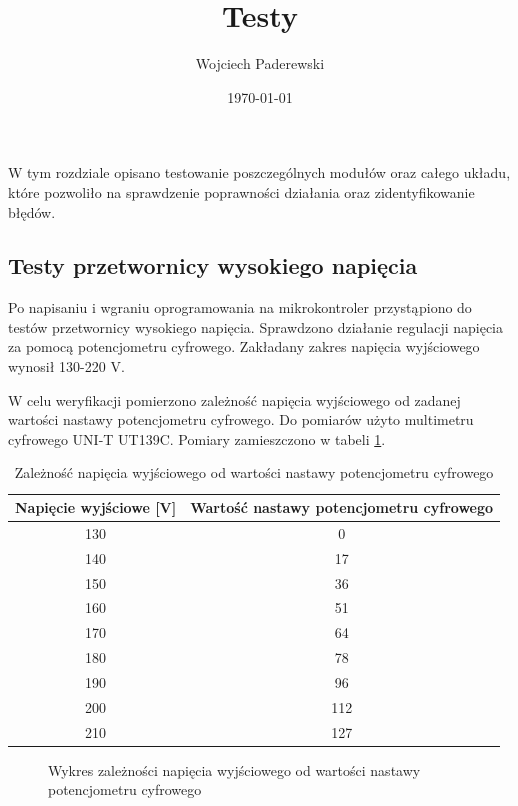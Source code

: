 \documentclass[../main.tex]{subfiles}
\author{Wojciech Paderewski}
\date{\today}
\title{Testy}
\begin{document}
W tym rozdziale opisano testowanie poszczególnych 
modułów oraz całego układu, które pozwoliło na sprawdzenie poprawności działania oraz zidentyfikowanie błędów.

\subsection{Testy przetwornicy wysokiego napięcia}
Po napisaniu i wgraniu oprogramowania na mikrokontroler przystąpiono do testów przetwornicy wysokiego napięcia.
Sprawdzono działanie regulacji napięcia za pomocą potencjometru cyfrowego. Zakładany zakres napięcia wyjściowego wynosił 130-220 V.

W celu weryfikacji pomierzono zależność napięcia wyjściowego od zadanej wartości nastawy potencjometru cyfrowego.
Do pomiarów użyto multimetru cyfrowego UNI-T UT139C. Pomiary zamieszczono w tabeli \ref{tab:voltage}.

\begin{table}[H]
    \centering
    \begin{tabular}{|c|c|}
        \hline
        Napięcie wyjściowe [V] & Wartość nastawy potencjometru cyfrowego \\
        \hline
        130 & 0 \\
        140 & 17 \\
        150 & 36 \\
        160 & 51 \\
        170 & 64 \\
        180 & 78 \\
        190 & 96 \\
        200 & 112 \\
        210 & 127 \\
        \hline
    \end{tabular}
    \caption{Zależność napięcia wyjściowego od wartości nastawy potencjometru cyfrowego}
    \label{tab:voltage}
\end{table}

\begin{figure}[H]
  \centering
  \caption{Wykres zależności napięcia wyjściowego od wartości nastawy potencjometru cyfrowego}
\end{figure}
\end{document}
